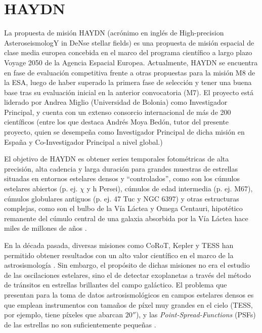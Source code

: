 \section{HAYDN}
La propuesta de misión HAYDN (acrónimo en inglés de High-precision AsteroseismologY in DeNse stellar fields) \citep{HAYDN} es una propuesta de misión espacial de clase media europea concebida en el marco del programa científico a largo plazo Voyage 2050 de la Agencia Espacial Europea. Actualmente, HAYDN se encuentra en fase de evaluación competitiva frente a otras propuestas para la misión M8 de la ESA, luego de haber superado la primera fase de selección y tener una buena base tras su evaluación inicial en la anterior convocatoria (M7). El proyecto está liderado por Andrea Miglio (Universidad de Bolonia) como Investigador Principal, y cuenta con un extenso consorcio internacional de más de 200 científicos (entre los que destaca Andrés Moya Bedón, tutor del presente proyecto, quien se desempeña como Investigador Principal de dicha misión en España y Co-Investigador Principal a nivel global.)

El objetivo de HAYDN es obtener series temporales fotométricas de alta precisión, alta cadencia y larga duración para grandes muestras de estrellas situadas en entornos estelares densos y ``controlados'', como son los cúmulos estelares abiertos (p. ej. $\chi$ y h Persei), cúmulos de edad intermedia (p. ej. M67), cúmulos globulares antiguos (p. ej. 47 Tuc y NGC 6397) y otras estructuras complejas, como son el bulbo de la Vía Láctea y Omega Centauri, hipotético remanente del cúmulo central de una galaxia absorbida por la Vía Láctea hace miles de millones de años \citep{Bekki_2003, haydn_mission_proposal_2026}.

En la década pasada, diversas misiones como CoRoT, Kepler y TESS han permitido obtener resultados con un alto valor científico en el marco de la astrosismología \citep{HAYDN,haydn_mission_proposal_2026, TASC8KASC15AbstractBooklet, IAUCommissionG4Report2024}. Sin embargo, el propósito de dichas misiones no era el estudio de las oscilaciones estelares, sino el de detectar exoplanetas a través del método de tránsitos en estrellas brillantes del campo galáctico. El problema que presentan para la toma de datos astrosismológicos en campos estelares densos es que emplean instrumentos con tamaños de píxel muy grandes en el cielo (TESS, por ejemplo, tiene píxeles que abarcan $20''$), y las \textit{Point-Spread-Functions} (PSFs) de las estrellas no son suficientemente pequeñas \citep{HAYDN,haydn_mission_proposal_2026}.

